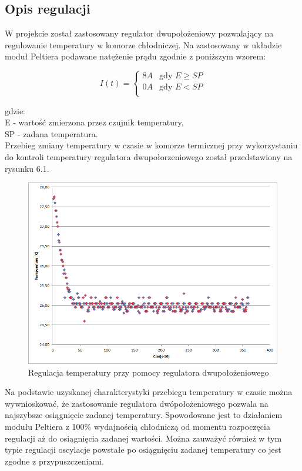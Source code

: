 \documentclass[oneside]{mgr}
\begin{document}
\subsection{Opis regulacji}
W projekcie został zastosowany regulator dwupołożeniowy pozwalający na regulowanie temperatury w komorze chłodniczej. Na zastosowany w układzie moduł Peltiera podawane natężenie prądu zgodnie z poniższym wzorem:
\begin{center}
\begin{equation*}
    I(t) = \left\{ \begin{array}{ll}
    8A & \textrm{gdy $E \geq SP$}\\
    0A & \textrm{gdy $E < SP$}\\
\end{array} \right.
\end{equation*}
\end{center}
gdzie: \\
E - wartość zmierzona przez czujnik temperatury, \\
SP - zadana temperatura. \\

Przebieg zmiany temperatury w czasie w komorze termicznej przy wykorzystaniu do kontroli temperatury regulatora dwupołorzeniowego został przedstawiony na rysunku 6.1.
\begin{center}
\begin{figure}[h!]
    \centering
    \includegraphics[width=\textwidth]{Dwupolozeniowy.png}
    \caption{Regulacja temperatury przy pomocy regulatora dwupołożeniowego}
    \end{figure}
\end{center}
Na podstawie uzyskanej charakterystyki przebiegu temperatury w czasie można wywnioskować, że zastosowanie regulatora dwópołożeniowego pozwala na najszybsze osiągnięcie zadanej temperatury. Spowodowane jest to działaniem modułu Peltiera z 100\% wydajnością chłodniczą od momentu rozpoczęcia regulacji aż do osiągnięcia zadanej wartości. Można zauważyć również w tym typie regulacji oscylacje powstałe po osiągnięciu zadanej temperatury co jest zgodne z przypuszczeniami.
\end{document}
